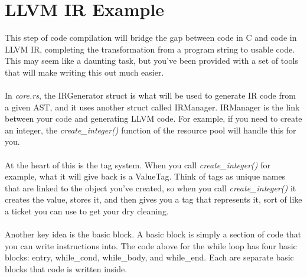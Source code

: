 \documentclass[
	12pt, %
]{fphw}
\begin{document}
\section*{LLVM IR Example}


This step of code compilation will bridge the gap between code in C and code in LLVM IR, completing the transformation from a program string to usable code. This may seem like a daunting task, but you've been provided with a set of tools that will make writing this out much easier.\\
\\
In \textit{core.rs}, the IRGenerator struct is what will be used to generate IR code from a given AST, and it uses another struct called IRManager. IRManager is the link between your code and generating LLVM code. For example, if you need to create an integer, the \textit{create\_integer()} function of the resource pool will handle this for you.\\
\\
At the heart of this is the tag system. When you call \textit{create\_integer()} for example, what it will give back is a ValueTag. Think of tags as unique names that are linked to the object you've created, so when you call \textit{create\_integer()} it creates the value, stores it, and then gives you a tag that represents it, sort of like a ticket you can use to get your dry cleaning.\\
\\
Another key idea is the basic block. A basic block is simply a section of code that you can write instructions into. The code above for the while loop has four basic blocks: entry, while\_cond, while\_body, and while\_end. Each are separate basic blocks that code is written inside.
\end{document}
